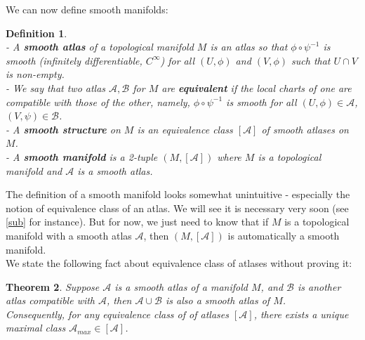 \documentclass[11pt]{book}
\newtheorem{theorem}{Theorem}[section]
\newtheorem{definition}[theorem]{Definition}
\newcommand{\mc}[1]{\mathcal{#1}}
\begin{document}
We can now define smooth manifolds:
\begin{definition} \mbox{}\\
- A \textbf{smooth atlas} of a topological manifold $M$ is an atlas so that $\phi \circ \psi^{-1}$ is smooth (infinitely differentiable, $C^{\infty}$) for all $(U,\phi)$ and $(V,\phi)$ such that $U \cap V$ is non-empty.\\
- We say that two atlas $\mc{A}, \mc{B}$ for $M$ are \textbf{equivalent} if the local charts of one are compatible with those of the other, namely, $\phi \circ \psi^{-1}$ is smooth for all $(U, \phi) \in \mc{A}$, $(V, \psi) \in \mc{B}$. \\
- A \textbf{smooth structure} on $M$ is an equivalence class $[\mc{A}]$ of smooth atlases on $M$.\\
- A \textbf{smooth manifold} is a 2-tuple $(M,[\mathcal{A}])$ where $M$ is a topological manifold and $\mathcal{A}$ is a smooth atlas.
\end{definition}
The definition of a smooth manifold looks somewhat unintuitive - especially the notion of equivalence class of an atlas. We will see it is necessary very soon (see \ref{sub} for instance). But for now, we just need to know that if $M$ is a topological manifold with a smooth atlas $\mc{A}$, then $(M, [\mc{A}])$ is automatically a smooth manifold.\\
We state the following fact about equivalence class of atlases without proving it:
\begin{theorem}
Suppose $\mc{A}$ is a smooth atlas of a manifold $M$, and $\mc{B}$ is another atlas compatible with $\mc{A}$, then $\mc{A} \cup \mc{B}$ is also a smooth atlas of $M$.\\
Consequently, for any equivalence class of of atlases $[\mc{A}]$, there exists a unique maximal class $\mc{A}_{max} \in [\mc{A}]$.
\end{theorem}
\end{document}
